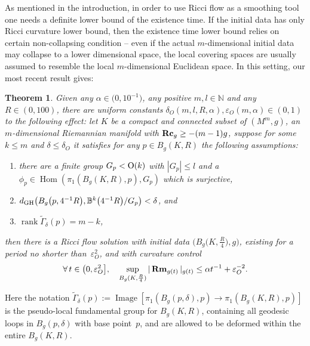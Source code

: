 \documentclass[pdftex]{sigma}
\numberwithin{equation}{section}
\newtheorem{Theorem}{Theorem}[section]
\newcommand{\Rm}{\operatorname{\bf Rm}}
\newcommand{\Rc}{\operatorname{\bf Rc}}
\newcommand{\rank}{\operatorname{rank}}
\begin{document}
As mentioned in the introduction, in order to use Ricci flow as a smoothing
tool one needs a definite lower bound of the existence time. If the initial
data has only Ricci curvature lower bound, then the existence time lower bound
relies on certain non-collapsing condition -- even if the actual
$m$-dimensional initial data may collapse to a lower dimensional space, the
local covering spaces are usually assumed to resemble the local $m$-dimensional
Euclidean space. In this setting, our most recent result \cite[Theorem~1.2]{HW20b} gives:
 \begin{Theorem}\label{thm: HW20b1}
Given any $\alpha\in \big(0,10^{-1}\big)$, any positive $m, l\in \mathbb{N}$ and any
$R\in (0,100)$, there are uniform constants $\delta_{O}(m,l,R,\alpha),
\varepsilon_{O}(m,\alpha)\in (0,1)$ to the following effect: let $K$ be a
compact and connected subset of $(M^m,g)$, an $m$-dimensional Riemannian
manifold with $\Rc_g\ge -(m-1)g$, suppose for some $k\le m$ and $\delta\le
\delta_O$ it satisfies for any $p\in B_g(K,R)$ the following assumptions:
\begin{enumerate}\itemsep=0pt
 \item[$1)$] there are a finite group $G_p<{\rm O}(k)$ with $ |G_p |\le l$ and a
 $\phi_p \in \operatorname{Hom} (\pi_1(B_g(K,R),p),G_p )$ which is
 surjective,
 \item[$2)$] $d_{\rm GH}\big( B_g\big(p,4^{-1}R\big), \mathbb{B}^k\big(4^{-1}R\big)\slash
 G_p\big)<\delta$, and
 \item[$3)$] $\rank \tilde{\Gamma}_{\delta}(p)=m-k$,
 \end{enumerate}
then there is a Ricci flow solution with initial data $\big(B_g\big(K,\frac{R}{4}\big),g\big)$,
existing for a period no shorter than~$\varepsilon_{O}^2$, and with curvature
control
\begin{align*}
\forall\, t\in \big(0,\varepsilon_{O}^2\big],\quad
\sup_{B_g(K,\frac{R}{4})} |\Rm_{g(t)} |_{g(t)} \le \alpha t^{-1} +\varepsilon_{O}^{-2}.
\end{align*}
\end{Theorem}
Here the notation
$\tilde{\Gamma}_{\delta}(p):=\operatorname{Image} [\pi_1(B_g(p,\delta),p)\to
\pi_1(B_g(K,R),p) ]$ is the pseudo-local fundamental
group for $B_g(K,R)$, containing all geodesic loops in $B_g(p,\delta)$ with base
point~$p$, and are allowed to be deformed within the entire $B_g(K,R)$.
\end{document}
